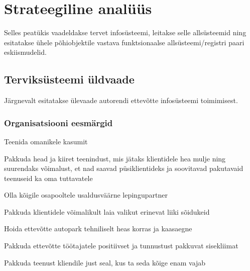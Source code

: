 \chapter{Strateegiline analüüs}
Selles peatükis vaadeldakse tervet infosüsteemi, leitakse selle allsüsteemid ning esitatakse ühele põhiobjektile vastava funktsionaalse allsüsteemi/registri paari eskiismudelid.

\section{Terviksüsteemi üldvaade}
Järgnevalt esitatakse ülevaade autorendi ettevõtte infosüsteemi toimimisest.

\subsection{Organisatsiooni eesmärgid}
\begin{myitemize}
	\item Teenida omanikele kasumit
	\item Pakkuda head ja kiiret teenindust, mis jätaks klientidele hea mulje ning suurendaks võimalust, et nad saavad püsiklientideks ja soovitavad pakutavaid teenuseid ka oma tuttavatele
	\item Olla kõigile osapooltele usaldusväärne lepingupartner
	\item Pakkuda klientidele võimalikult laia valikut erinevat liiki sõidukeid
	\item Hoida ettevõtte autopark tehniliselt heas korras ja kaasaegne
	\item Pakkuda ettevõtte töötajatele positiivset ja tunnustust pakkuvat sisekliimat
	\item Pakkuda teenust kliendile just seal, kus ta seda kõige enam vajab
\end{myitemize}

